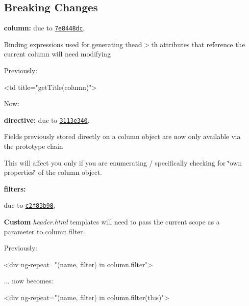 \subsection*{Breaking Changes}


\begin{DoxyItemize}
\item {\bfseries column\+:} due to \href{https://github.com/esvit/ng-table/commit/7e8448dc41c4e543c8b04d9836fdd81806846d06}{\tt 7e8448dc},
\item Binding expressions used for generating {\ttfamily thead$>$th} attributes that reference the current column will need modifying

Previously\+: 
\begin{DoxyCode}
<td title="getTitle(column)">
\end{DoxyCode}


Now\+: 

\item {\bfseries directive\+:} due to \href{https://github.com/esvit/ng-table/commit/3113e340ad6ee348f574762ddd2de78a1fad614d}{\tt 3113e340},
\item Fields previously stored directly on a column object are now only available via the prototype chain
\end{DoxyItemize}

This will affect you only if you are enumerating / specifically checking for \char`\"{}own properties\char`\"{} of the column object.
\begin{DoxyItemize}
\item {\bfseries filters\+:}
\begin{DoxyItemize}
\item due to \href{https://github.com/esvit/ng-table/commit/c2f83b9877b23b0124885b2cd9ab1fc705970f49}{\tt c2f83b98},
\end{DoxyItemize}
\end{DoxyItemize}

{\bfseries Custom} {\itshape header.\+html} templates will need to pass the current scope as a parameter to column.\+filter.

Previously\+:


\begin{DoxyCode}
<div ng-repeat="(name, filter) in column.filter">
\end{DoxyCode}
 ... now becomes\+:


\begin{DoxyCode}
<div ng-repeat="(name, filter) in column.filter(this)">
\end{DoxyCode}

